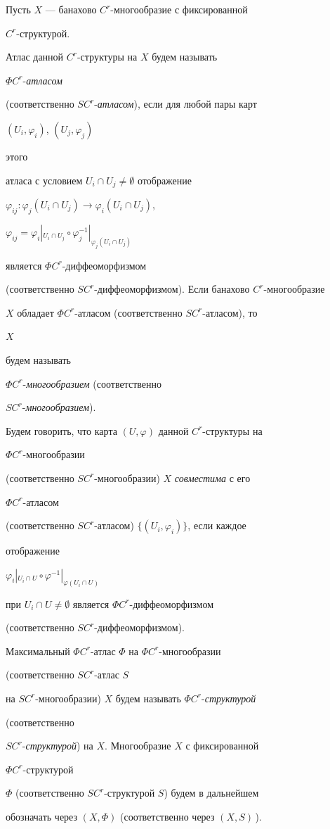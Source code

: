 \begin{defns}


Пусть $X$ --- банахово $C^r$-многообразие с фиксированной


$C^r$-структурой.


Атлас данной $C^r$-структуры на $X$ будем называть


$\Phi C^r$-{\em атласом}


(соответственно $SC^r$-{\em атласом}), если для любой пары карт


$(U_i,\varphi_i)$, $(U_j,\varphi_j)$


этого


атласа с условием $U_i\cap U_j\ne\emptyset$ отображение


$\varphi_{ij}:\varphi_j(U_i\cap U_j)\to\varphi_i(U_i\cap U_j)$,


$\varphi_{ij}=\varphi_i|_{U_i\cap U_j}\circ


\varphi^{-1}_j|_{\varphi_j(U_i\cap U_j)}$


является $\Phi C^r$-диффеоморфизмом


(соответственно $SC^r$-диффеоморфизмом). Если банахово $C^r$-многообразие


$X$ обладает $\Phi C^r$-атласом (соответственно $SC^r$-атласом), то


$X$


будем называть


$\Phi C^r$-{\em многообразием} (соответственно


$SC^r$-{\em многообразием}).


Будем говорить, что карта $(U,\varphi)$ данной $C^r$-структуры на


$\Phi C^r$-многообразии


(соответственно $SC^r$-многообразии) $X$ {\em совместима} с его


$\Phi C^r$-атласом


(соответственно $SC^r$-атласом) $\{(U_i,\varphi_i)\}$, если каждое


отображение


$\varphi_i|_{U_i\cap U}\circ


\varphi^{-1}|_{\varphi(U_i\cap U)}$


при $U_i\cap U\ne\emptyset$ является $\Phi C^r$-диффеоморфизмом


(соответственно $SC^r$-диффеоморфизмом).


Максимальный $\Phi C^r$-атлас $\Phi$ на $\Phi C^r$-многообразии


(соответственно $SC^r$-атлас $S$


на $SC^r$-многообразии) $X$ будем называть $\Phi C^r$-{\em структурой}


(соответственно


$SC^r$-{\em структурой}) на $X$. Многообразие $X$ с фиксированной


$\Phi C^r$-структурой


$\Phi$ (соответственно $SC^r$-структурой $S$) будем в дальнейшем


обозначать через $(X,\Phi)$ (соответственно через $(X,S)$\,).


\end{defns}





